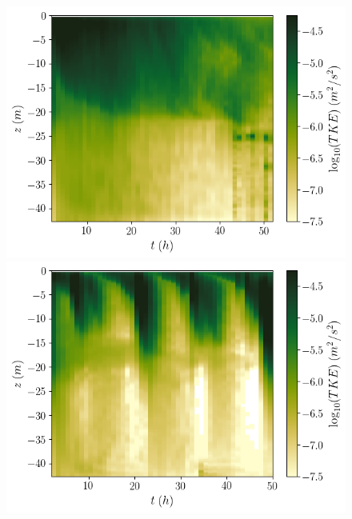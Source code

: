 \documentclass[draft]{agujournal2019}
\begin{document}
\begin{figure}[h!]
    \centering
    \begin{minipage}{0.4\textwidth}
        \includegraphics[trim={0 0cm 3cm 0cm},clip,width=\textwidth]{Figures/dslope2/e_hovmoller.png}
    \end{minipage}%
    \begin{minipage}{0.5\textwidth}
        \includegraphics[trim={0 0cm 0 0cm},clip,width=\textwidth]{Figures/dT4/e_hovmoller.png}
    \end{minipage}
    \begin{minipage}{0.4\textwidth}

\end{minipage}
\end{figure}
\end{document}
